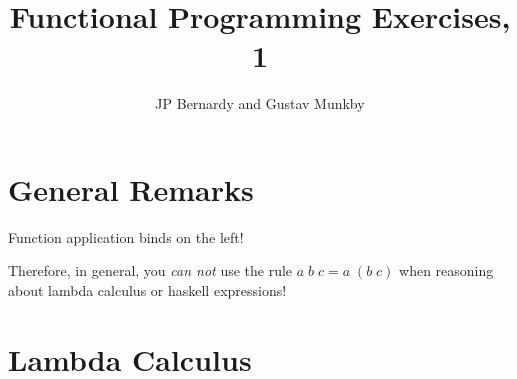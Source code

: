 \documentclass{article}
\title{Functional Programming Exercises, 1}
\author{JP Bernardy and Gustav Munkby}
\newcommand{\Varid}[1]{\mathit{#1}}
\begin{document}
\maketitle

\section{General Remarks}

Function application binds on the left!

Therefore, in general, you {\em can not} use the rule
\ensuremath{\Varid{a}\;\Varid{b}\;\Varid{c}\mathrel{=}\Varid{a}\;(\Varid{b}\;\Varid{c})}
when reasoning about lambda calculus or haskell expressions!

\section{Lambda Calculus}

\end{document}
